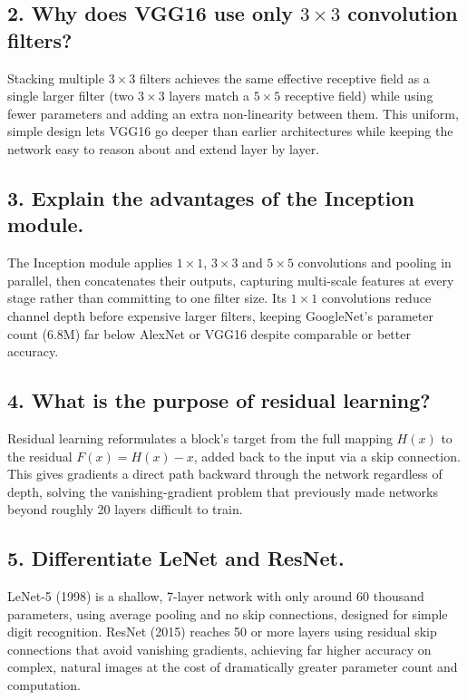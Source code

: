 \documentclass[11pt,a4paper]{article}
\begin{document}
\subsection*{2. Why does VGG16 use only $3\times3$ convolution filters?}

Stacking multiple $3\times3$ filters achieves the same effective receptive field as a single larger filter (two $3\times3$ layers match a $5\times5$ receptive field) while using fewer parameters and adding an extra non-linearity between them. This uniform, simple design lets VGG16 go deeper than earlier architectures while keeping the network easy to reason about and extend layer by layer.

\subsection*{3. Explain the advantages of the Inception module.}

The Inception module applies $1\times1$, $3\times3$ and $5\times5$ convolutions and pooling in parallel, then concatenates their outputs, capturing multi-scale features at every stage rather than committing to one filter size. Its $1\times1$ convolutions reduce channel depth before expensive larger filters, keeping GoogleNet's parameter count (6.8M) far below AlexNet or VGG16 despite comparable or better accuracy.

\subsection*{4. What is the purpose of residual learning?}

Residual learning reformulates a block's target from the full mapping $H(x)$ to the residual $F(x)=H(x)-x$, added back to the input via a skip connection. This gives gradients a direct path backward through the network regardless of depth, solving the vanishing-gradient problem that previously made networks beyond roughly 20 layers difficult to train.

\subsection*{5. Differentiate LeNet and ResNet.}

LeNet-5 (1998) is a shallow, 7-layer network with only around 60 thousand parameters, using average pooling and no skip connections, designed for simple digit recognition. ResNet (2015) reaches 50 or more layers using residual skip connections that avoid vanishing gradients, achieving far higher accuracy on complex, natural images at the cost of dramatically greater parameter count and computation.
\end{document}
